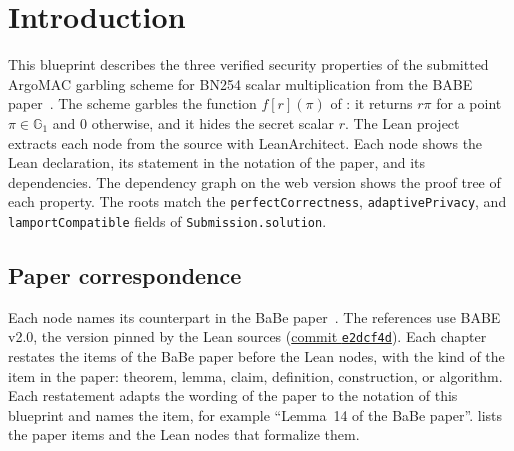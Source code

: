 

\chapter{Introduction}

This blueprint describes the three verified security properties of the submitted ArgoMAC garbling scheme for BN254 scalar multiplication from the BABE paper~\cite{babe}.
The scheme garbles the function $f[r](\pi)$ of \cite[Eq.~27]{babe}: it returns $r\pi$ for a point $\pi \in \mathbb{G}_1$ and $0$ otherwise, and it hides the secret scalar $r$.
The Lean project extracts each node from the source with LeanArchitect.
Each node shows the Lean declaration, its statement in the notation of the paper, and its dependencies.
The dependency graph on the web version shows the proof tree of each property.
The roots match the \texttt{perfectCorrectness}, \texttt{adaptivePrivacy}, and \texttt{lamportCompatible} fields of \texttt{Submission.solution}.

\section{Paper correspondence}

Each node names its counterpart in the BaBe paper~\cite{babe}.
The references use BABE v2.0, the version pinned by the Lean sources
(\href{https://github.com/babylonlabs-io/BaBe.latex/tree/e2dcf4d540b2708e13cd21090df759051119a116}{commit \texttt{e2dcf4d}}).
Each chapter restates the items of the BaBe paper before the Lean nodes, with the kind of the item in the paper: theorem, lemma, claim, definition, construction, or algorithm.
Each restatement adapts the wording of the paper to the notation of this blueprint and names the item, for example ``Lemma~14 of the BaBe paper''.
 lists the paper items and the Lean nodes that formalize them.

